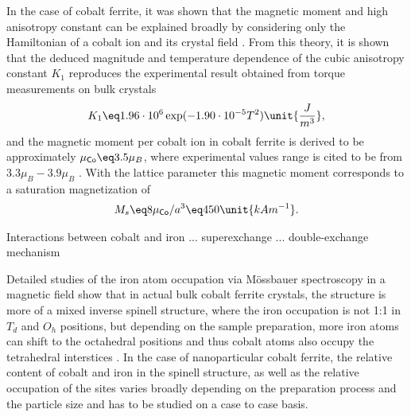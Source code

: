 \documentclass[\main/dresen_thesis.tex]{subfiles}
\begin{document}
  In the case of cobalt ferrite, it was shown that the magnetic moment and high anisotropy constant can be explained broadly by considering only the Hamiltonian of a cobalt ion and its crystal field \cite{Slonczewski_1958_Origi, Tachiki_1960_Origi}.
  From this theory, it is shown that the deduced magnitude and temperature dependence of the cubic anisotropy constant $K_1$ reproduces the experimental result obtained from torque measurements on bulk crystals \cite{Shenker_1957_Magne}
  \begin{align}
    K_1 \eq 1.96 \cdot 10^6 \exp(-1.90 \cdot 10^{-5} T^2) \unit{\frac{J}{m^3}},
  \end{align}
  and the magnetic moment per cobalt ion in cobalt ferrite is derived to be approximately $\mu_\textsf{Co} \eq 3.5 \mu_B$, where experimental values range is cited to be from $3.3 \mu_B - 3.9 \mu_B$ \cite{Tachiki_1960_Origi}.
  With the lattice parameter this magnetic moment corresponds to a saturation magnetization of
  \begin{align}
    M_s \eq 8\mu_\textsf{Co}/a^3 \eq 450 \unit{kAm^{-1}}.
  \end{align}

  Interactions between cobalt and iron ... superexchange ... double-exchange mechanism

  Detailed studies of the iron atom occupation via M\"ossbauer spectroscopy in a magnetic field show that in actual bulk cobalt ferrite crystals, the structure is more of a mixed inverse spinell structure, where the iron occupation is not 1:1 in $T_d$ and $O_h$ positions, but depending on the sample preparation, more iron atoms can shift to the octahedral positions and thus cobalt atoms also occupy the tetrahedral interstices \cite{Sawatzky_1968_Catio, Sawatzky_1969_Mossb}.
  In the case of nanoparticular cobalt ferrite, the relative content of cobalt and iron in the spinell structure, as well as the relative occupation of the sites varies broadly depending on the preparation process and the particle size \cite{Muscas_2015_Evolu, Repko_2015_Oleate, Peddis_2008_Spinc} and has to be studied on a case to case basis.
\end{document}
